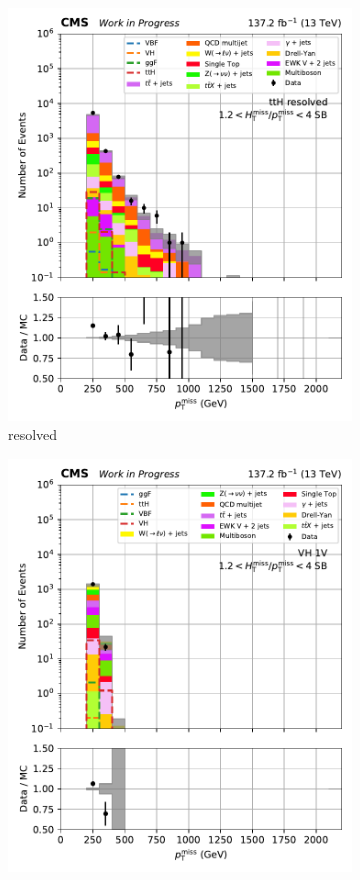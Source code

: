 \begin{figure}[htbp]
\begin{subfigure}[b]{0.24\textwidth}
        \includegraphics[width=\textwidth]{figures/region_plots/2016to18/sideband_2/ttH_resolved.pdf}
        \caption{\ttH resolved}
    \end{subfigure}
    \begin{subfigure}[b]{0.24\textwidth}
        \includegraphics[width=\textwidth]{figures/region_plots/2016to18/sideband_2/VH_1V.pdf}

\end{subfigure}
\end{figure}
